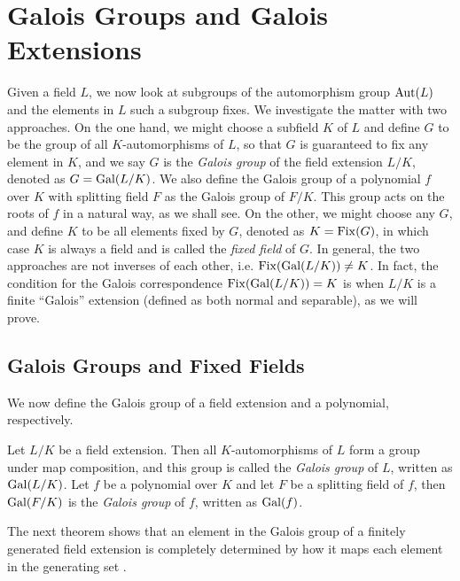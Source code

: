 \section{Galois Groups and Galois Extensions}

Given a field $L$, we now look at subgroups of the automorphism group $\operatorname{Aut}(L)$ and the elements in $L$ such a subgroup fixes. We investigate the matter with two approaches. On the one hand, we might choose a subfield $K$ of $L$ and define $G$ to be the group of all $K$-automorphisms of $L$, so that $G$ is guaranteed to fix any element in $K$, and we say $G$ is the \textit{Galois group} of the field extension $L/K$, denoted as $G = \operatorname{Gal}(L/K)$. We also define the Galois group of a polynomial $f$ over $K$ with splitting field $F$ as the Galois group of $F / K$. This group acts on the roots of $f$ in a natural way, as we shall see. On the other, we might choose any $G$, and define $K$ to be all elements fixed by $G$, denoted as $K = \operatorname{Fix}(G)$, in which case $K$ is always a field and is called the \textit{fixed field} of $G$. In general, the two approaches are not inverses of each other, i.e. $\operatorname{Fix}(\operatorname{Gal}(L/K)) \neq K$. In fact, the condition for the Galois correspondence $\operatorname{Fix}(\operatorname{Gal}(L/K)) = K$ is when $L/K$ is a finite ``Galois'' extension (defined as both normal and separable), as we will prove. 


\subsection{Galois Groups and Fixed Fields}

We now define the Galois group of a field extension and a polynomial, respectively.
\begin{definition}
    Let $L/K$ be a field extension. Then all $K$-automorphisms of $L$ form a group under map composition, and this group is called the \textit{Galois group} of $L$, written as \(\operatorname{Gal}(L/K)\).
	Let $f$ be a polynomial over $K$ and let $F$ be a splitting field of $f$, then $\operatorname{Gal}(F/K)$ is the \textit{Galois group} of $f$, written as \(\operatorname{Gal}(f)\).
	
\end{definition}

The next theorem shows that an element in the Galois group of a finitely generated field extension is completely determined by how it maps each element in the generating set \cite{morandi_field_1996}. 

